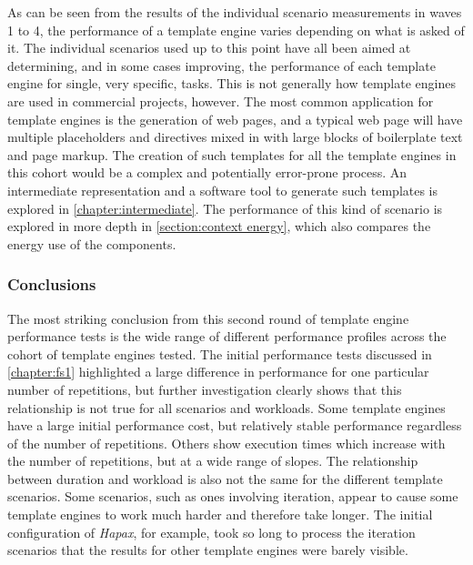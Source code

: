 As can be seen from the results of the individual scenario measurements in waves 1 to 4, the performance of a template engine varies depending on what is asked of it. The individual scenarios used up to this point have all been aimed at determining, and in some cases improving, the performance of each template engine for single, very specific, tasks. This is not generally how template engines are used in commercial projects, however. The most common application for template engines is the generation of web pages, and a typical web page will have multiple placeholders and directives mixed in with large blocks of boilerplate text and page markup. The creation of such templates for all the template engines in this cohort would be a complex and potentially error-prone process. An intermediate representation and a software tool to generate such templates is explored in \autoref{chapter:intermediate}. The performance of this kind of scenario is explored in more depth in \autoref{section:context energy}, which also compares the energy use of the components.

\subsubsection{Conclusions}
\label{comp:conclusions}

The most striking conclusion from this second round of template engine performance tests is the wide range of different performance profiles across the cohort of template engines tested. The initial performance tests discussed in \autoref{chapter:fs1} highlighted a large difference in performance for one particular number of repetitions, but further investigation clearly shows that this relationship is not true for all scenarios and workloads. Some template engines have a large initial performance cost, but relatively stable performance regardless of the number of repetitions. Others show execution times which increase with the number of repetitions, but at a wide range of slopes. The relationship between duration and workload is also not the same for the different template scenarios. Some scenarios, such as ones involving iteration, appear to cause some template engines to work much harder and therefore take longer. The initial configuration of \emph{Hapax}, for example, took so long to process the iteration scenarios that the results for other template engines were barely visible.


